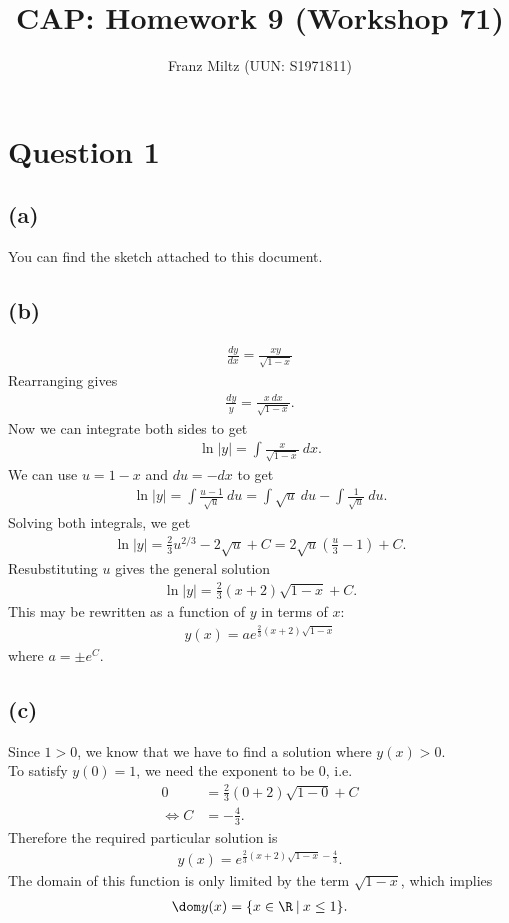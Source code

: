 \documentclass{article}
\title{CAP: Homework 9 (Workshop 71)}
\author{Franz Miltz (UUN: S1971811)}
\begin{document}
\maketitle
\section*{Question 1}
\subsection*{(a)}
You can find the sketch attached to this document.
\subsection*{(b)}
\begin{align*}
  \frac{dy}{dx}=\frac{xy}{\sqrt{1-x}}
\end{align*}
Rearranging gives
\begin{align*}
  \frac{dy}{y}=\frac{x\:dx}{\sqrt{1-x}}.
\end{align*}
Now we can integrate both sides to get
\begin{align*}
  \ln|y| = \int \frac{x}{\sqrt{1-x}}\:dx.
\end{align*}
We can use $u=1-x$ and $du=-dx$ to get
\begin{align*}
  \ln|y| = \int \frac{u-1}{\sqrt{u}}\:du=\int \sqrt{u}\:du - \int \frac{1}{\sqrt{u}}\:du.
\end{align*}
Solving both integrals, we get
\begin{align*}
  \ln|y|=\frac{2}{3}u^{2/3}-2\sqrt{u}+C=2\sqrt{u}\left(\frac{u}{3}-1\right)+C.
\end{align*}
Resubstituting $u$ gives the general solution
\begin{align*}
  \ln|y|=\frac{2}{3}(x+2)\sqrt{1-x}+C.
\end{align*}
This may be rewritten as a function of $y$ in terms of $x$:
\begin{align*}
  y(x)=  ae^{\frac{2}{3}(x+2)\sqrt{1-x}}
\end{align*}
where $a=\pm e^C$.
\subsection*{(c)}
Since $1>0$, we know that we have to find a solution where $y(x)>0$.\\
To satisfy $y(0)=1$, we need the exponent to be $0$, i.e.
\begin{align*}
  0                 & =\frac{2}{3}(0+2)\sqrt{1-0}+C \\
  \Leftrightarrow C & = -\frac{4}{3}.
\end{align*}
Therefore the required particular solution is
\begin{align*}
  y(x)=e^{\frac{2}{3}(x+2)\sqrt{1-x}-\frac{4}{3}}.
\end{align*}
The domain of this function is only limited by the term $\sqrt{1-x}$, which implies \begin{align*}
  \dom y(x) = \{x\in\R\:|\: x\leq 1\}.
\end{align*}
\end{document}
